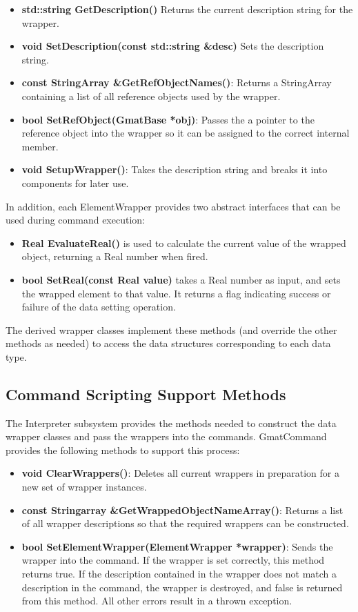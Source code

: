 \begin{itemize}
\item\textbf{std::string GetDescription()} Returns the current description string for the wrapper.
\item\textbf{void SetDescription(const std::string \&desc)} Sets the description string.
\item\textbf{const StringArray \&GetRefObjectNames()}: Returns a StringArray containing a list of
all reference objects used by the wrapper.
\item\textbf{bool SetRefObject(GmatBase *obj)}: Passes the a pointer to the reference object
into the wrapper so it can be assigned to the correct internal member.
\item\textbf{void SetupWrapper()}: Takes the description string and breaks it into components for
later use.
\end{itemize}

In addition, each ElementWrapper provides two abstract interfaces that can be used during command
execution:

\begin{itemize}
\item\textbf{Real EvaluateReal()} is used to calculate the current value of the wrapped
object, returning a Real number when fired.
\item\textbf{bool SetReal(const Real value)} takes a Real number as input, and sets the wrapped
element to that value.  It returns a flag indicating success or failure of the data setting
operation.
\end{itemize}

\noindent The derived wrapper classes implement these methods (and override the other methods as
needed) to access the data structures corresponding to each data type.

\subsection{\label{section:CommandScriptingSupport}Command Scripting Support Methods}

The Interpreter subsystem provides the methods needed to construct the data wrapper classes and
pass the wrappers into the commands.  GmatCommand provides the following methods to support this
process:

\begin{itemize}
\item\textbf{void ClearWrappers()}: Deletes all current wrappers in preparation for a new set of
wrapper instances.
\item\textbf{const Stringarray \&GetWrappedObjectNameArray()}: Returns a list of all wrapper
descriptions so that the required wrappers can be constructed.
\item\textbf{bool SetElementWrapper(ElementWrapper *wrapper)}: Sends the wrapper into the command.
If the wrapper is set correctly, this method returns true.  If the description contained in the
wrapper does not match a description in the command, the wrapper is destroyed, and false is returned
from this method.  All other errors result in a thrown exception.
\end{itemize}

